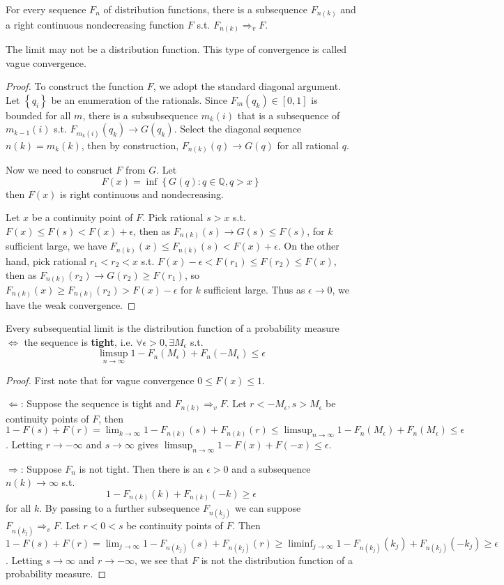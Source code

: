 \begin{theorem}
For every sequence $F_n$ of distribution functions, there is a subsequence $F_{n(k)}$ and a right continuous nondecreasing function $F$ s.t. $F_{n(k)}\Longrightarrow_v F$.
\end{theorem}
\begin{remark}
The limit may not be a distribution function. This type of convergence is called vague convergence.
\end{remark}
\begin{proof}
To construct the function $F$, we adopt the standard diagonal argument. Let $\left \{ q_i \right \} $ be an enumeration of the rationals. Since $F_m(q_k)\in [0,1]$ is bounded for all $m$, there is a subsubsequence $m_k(i)$ that is a subsequence of $m_{k-1}(i)$ s.t. $F_{m_k(i)}(q_k)\longrightarrow G(q_k)$. Select the diagonal sequence $n(k)=m_k(k)$, then by construction, $F_{n(k)}(q)\longrightarrow G(q)$ for all rational $q$.\par
Now we need to consruct $F$ from $G$. Let \[F(x)=\inf \left \{ G(q):q\in \mathbb{Q},q>x \right \} \]then $F(x)$ is right continuous and nondecreasing.\par
Let $x$ be a continuity point of $F$. Pick rational $s>x$ s.t. $F(x)\le F(s)< F(x)+\epsilon$, then as $F_{n(k)}(s)\longrightarrow G(s)\le F(s)$, for $k$ sufficient large, we have $F_{n(k)}(x)\le F_{n(k)}(s)<F(x)+\epsilon$. On the other hand, pick rational $r_1<r_2<x$ s.t. $F(x)-\epsilon<F(r_1)\le F(r_2)\le F(x)$, then as $F_{n(k)}(r_2)\longrightarrow G(r_2)\ge F(r_1)$, so $F_{n(k)}(x)\ge F_{n(k)}(r_2)>F(x)-\epsilon$ for $k$ sufficient large. Thus as $\epsilon\to 0$, we have the weak convergence.
\end{proof}
\begin{theorem}
Every subsequential limit is the distribution function of a probability measure $\Longleftrightarrow$ the sequence is \textbf{tight}, i.e. $\forall \epsilon>0,\exists M_\epsilon$ s.t.
\[\limsup_{n\to\infty} 1-F_n(M_\epsilon)+F_n(-M_\epsilon)\le \epsilon\]
\end{theorem}
\begin{proof}
First note that for vague convergence $0\le F(x)\le 1$.\par
$\Longleftarrow$: Suppose the sequence is tight and $F_{n(k)}\Longrightarrow_v F$. Let $r<-M_\epsilon,s>M_\epsilon$ be continuity points of $F$, then $1-F(s)+F(r)=\lim_{k\to\infty}1-F_{n(k)}(s)+F_{n(k)}(r)\le \limsup_{n\to\infty}1-F_n(M_\epsilon)+F_n(M_\epsilon)\le \epsilon$. Letting $r\to-\infty$ and $s\to\infty$ gives $\limsup_{n\to\infty}1-F(x)+F(-x)\le \epsilon$.\par
$\Longrightarrow$: Suppose $F_n$ is not tight. Then there is an $\epsilon>0$ and a subsequence $n(k)\to\infty$ s.t. \[1-F_{n(k)}(k)+F_{n(k)}(-k)\ge\epsilon\] for all $k$. By passing to a further subsequence $F_{n(k_j)}$ we can suppose $F_{n(k_j)}\Longrightarrow_v F$. Let $r<0<s$ be continuity points of $F$. Then $1-F(s)+F(r)=\lim_{j\to\infty} 1-F_{n(k_j)}(s)+F_{n(k_j)}(r)\ge\liminf_{j\to\infty}1-F_{n(k_j)}(k_j)+F_{n(k_j)}(-k_j)\ge\epsilon$. Letting $s\to\infty$ and $r\to-\infty$, we see that $F$ is not the distribution function of a probability measure.
\end{proof}

